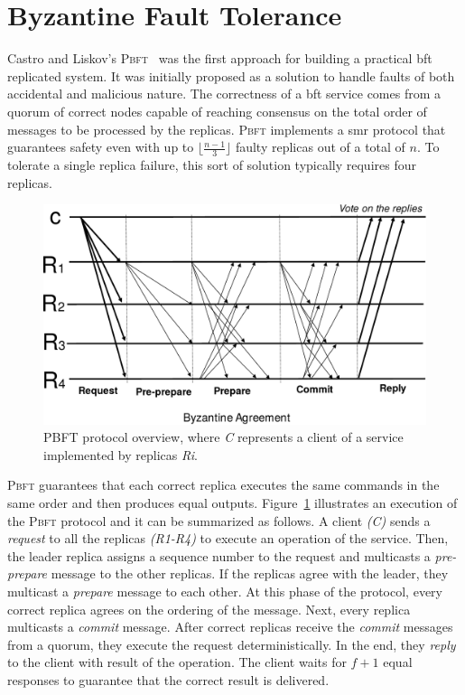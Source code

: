 \section{Byzantine Fault Tolerance}

Castro and Liskov’s \textsc{Pbft}~\cite{Castro:1999} was the first approach for building a practical \gls{bft} replicated system.
It was initially proposed as a solution to handle faults of both accidental and malicious nature.
The correctness of a \gls{bft} service comes from a quorum of correct nodes capable of reaching consensus on the total order of messages to be processed by the replicas.
\textsc{Pbft} implements a \gls{smr} protocol that guarantees safety even with up to $\lfloor\frac{n-1}{3}\rfloor$ faulty replicas out of a total of $n$. 
To tolerate a single replica failure, this sort of solution typically requires four replicas. 


\begin{figure}[t]
\begin{center}
\includegraphics[width=.7\columnwidth]{images/images/pbft.pdf}
\caption{PBFT protocol overview, where \emph{C} represents a client of a service implemented by replicas \emph{Ri}.}
\label{fig:bft}
\end{center}
\end{figure}

\textsc{Pbft} guarantees that each correct replica executes the same commands in the same order and then produces equal outputs. 
Figure~\ref{fig:bft} illustrates an execution of the \textsc{Pbft} protocol and it can be summarized as follows.
A client \emph{(C)} sends a \emph{request} to all the replicas \emph{(R1-R4)} to execute an operation of the service.
Then, the leader replica assigns a sequence number to the request and multicasts a \emph{pre-prepare} message to the other replicas. 
If the replicas agree with the leader, they multicast a \emph{prepare} message to each other. 
At this phase of the protocol, every correct replica agrees on the ordering of the message.  
Next, every replica multicasts a \emph{commit} message. 
After correct replicas receive the \emph{commit} messages from a quorum, they execute the request deterministically. 
In the end, they \emph{reply} to the client with result of the operation.
The client waits for $f+1$ equal responses to guarantee that the correct result is delivered.

